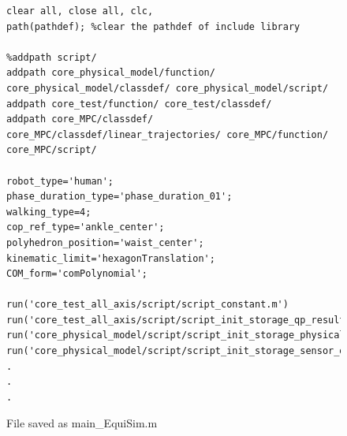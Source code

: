\documentclass[12pt,oneside,notitlepage,abstracton,a4paper]{scrartcl}
\begin{document}
\begin{figure}[ht]
\begin{center}
\begin{lstlisting}
clear all, close all, clc, 
path(pathdef); %clear the pathdef of include library 
 
%addpath script/ 
addpath core_physical_model/function/ core_physical_model/classdef/ core_physical_model/script/
addpath core_test/function/ core_test/classdef/  
addpath core_MPC/classdef/ core_MPC/classdef/linear_trajectories/ core_MPC/function/ core_MPC/script/
 
robot_type='human';  
phase_duration_type='phase_duration_01';
walking_type=4;
cop_ref_type='ankle_center'; 
polyhedron_position='waist_center';
kinematic_limit='hexagonTranslation';
COM_form='comPolynomial'; 
 
run('core_test_all_axis/script/script_constant.m') 
run('core_test_all_axis/script/script_init_storage_qp_result.m') 
run('core_physical_model/script/script_init_storage_physical_model.m') 
run('core_physical_model/script/script_init_storage_sensor_dynamics.m')
.
.
.
\end{lstlisting}
\end{center}
\caption{File saved as main\_EquiSim.m}
\label{fig:main1}
\end{figure}
  
\end{document}
